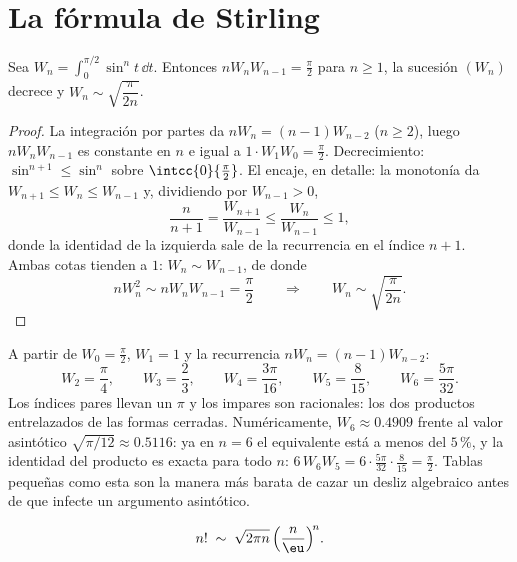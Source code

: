 \section{La fórmula de Stirling}

\begin{lemma}\label{lem:b2:comparison:wallis}
Sea $W_n = \int_0^{\pi/2} \sin^n t\,\dd t$. Entonces $nW_nW_{n-1} =
\frac\pi2$ para $n \geq 1$, la sucesión $(W_n)$ decrece y $W_n \sim
\sqrt{\dfrac{\pi}{2n}}$.
\end{lemma}

\begin{proof}
La integración por partes da $nW_n = (n-1)W_{n-2}$ ($n \geq 2$),
luego $nW_nW_{n-1}$ es constante en $n$ e igual a $1 \cdot W_1 W_0 =
\frac\pi2$. Decrecimiento: $\sin^{n+1} \leq \sin^n$ sobre
$\intcc{0}{\frac\pi2}$. El encaje, en detalle: la monotonía da
$W_{n+1} \leq W_n \leq W_{n-1}$ y, dividiendo por $W_{n-1} > 0$,
\[
\frac{n}{n+1} = \frac{W_{n+1}}{W_{n-1}} \leq
\frac{W_n}{W_{n-1}} \leq 1 ,
\]
donde la identidad de la izquierda sale de la recurrencia en el
índice $n + 1$. Ambas cotas tienden a $1$: $W_n \sim W_{n-1}$, de
donde
\[
nW_n^2 \sim nW_nW_{n-1} = \frac\pi2
\qquad\Longrightarrow\qquad
W_n \sim \sqrt{\frac{\pi}{2n}} .
\]
\end{proof}

\begin{example}\label{ex:b2:comparison:wallisvalues}
A partir de $W_0 = \frac\pi2$, $W_1 = 1$ y la recurrencia $nW_n =
(n-1)W_{n-2}$:
\[
W_2 = \frac\pi4, \qquad
W_3 = \frac23, \qquad
W_4 = \frac{3\pi}{16}, \qquad
W_5 = \frac{8}{15}, \qquad
W_6 = \frac{5\pi}{32}.
\]
Los índices pares llevan un $\pi$ y los impares son racionales: los
dos productos entrelazados de las formas cerradas. Numéricamente,
$W_6 \approx 0.4909$ frente al valor asintótico $\sqrt{\pi/12}
\approx 0.5116$: ya en $n = 6$ el equivalente está a menos del
$5\,\%$, y la identidad del producto es exacta para todo $n$:
$6\,W_6W_5 = 6\cdot\frac{5\pi}{32}\cdot\frac8{15} = \frac\pi2$.
Tablas pequeñas como esta son la manera más barata de cazar un
desliz algebraico antes de que infecte un argumento asintótico.
\end{example}

\begin{theorem}[Stirling]\label{thm:b2:comparison:stirling}
\[
n! \;\sim\; \sqrt{2\pi n}\, \Bigl(\frac{n}{\eu}\Bigr)^{\!n}
.\index{fórmula de Stirling}
\]
\end{theorem}

